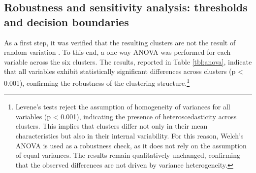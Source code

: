 \documentclass[a4paper,11pt,oneside]{article}
\begin{document}
\subsection{Robustness and sensitivity analysis:  thresholds and decision boundaries}
\label{sec:anova}



As a first step, it was verified that the resulting clusters are not the result of random variation \citep{everitt2011cluster}. To this end, a one-way ANOVA was performed for each variable across the six clusters. The results, reported in Table \ref{tbl:anova}, indicate that all variables exhibit statistically significant differences across clusters (p < 0.001), confirming the robustness of the clustering structure.\footnote{Levene’s tests reject the assumption of homogeneity of variances for all variables (p < 0.001), indicating the presence of heteroscedasticity across clusters. This implies that clusters differ not only in their mean characteristics but also in their internal variability. For this reason, Welch’s ANOVA is used as a robustness check, as it does not rely on the assumption of equal variances. The results remain qualitatively unchanged, confirming that the observed differences are not driven by variance heterogeneity.}
\end{document}
